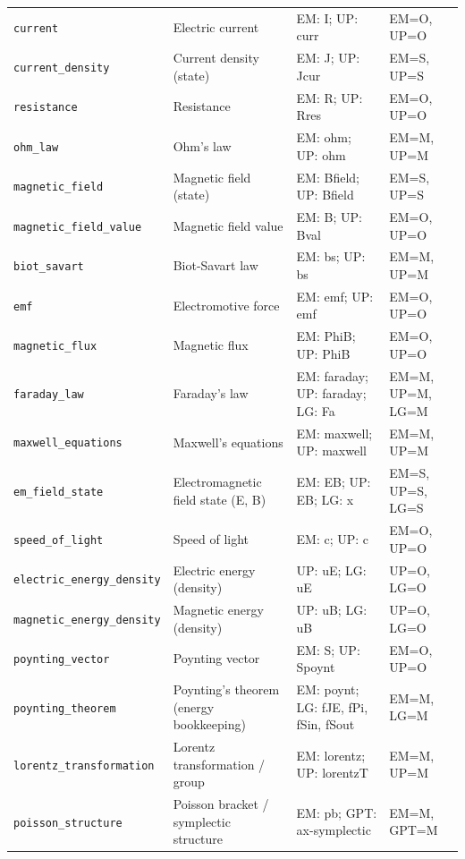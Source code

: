\begin{longtable}{@{}p{3.1cm}p{3.6cm}p{5.0cm}p{2.9cm}@{}}
\texttt{current} & Electric current & EM: I; UP: curr & EM=O, UP=O \\
\texttt{current\_\allowbreak{{}}density} & Current density (state) & EM: J; UP: Jcur & EM=S, UP=S \\
\texttt{resistance} & Resistance & EM: R; UP: Rres & EM=O, UP=O \\
\texttt{ohm\_\allowbreak{{}}law} & Ohm's law & EM: ohm; UP: ohm & EM=M, UP=M \\
\texttt{magnetic\_\allowbreak{{}}field} & Magnetic field (state) & EM: Bfield; UP: Bfield & EM=S, UP=S \\
\texttt{magnetic\_\allowbreak{{}}field\_\allowbreak{{}}value} & Magnetic field value & EM: B; UP: Bval & EM=O, UP=O \\
\texttt{biot\_\allowbreak{{}}savart} & Biot-Savart law & EM: bs; UP: bs & EM=M, UP=M \\
\texttt{emf} & Electromotive force & EM: emf; UP: emf & EM=O, UP=O \\
\texttt{magnetic\_\allowbreak{{}}flux} & Magnetic flux & EM: PhiB; UP: PhiB & EM=O, UP=O \\
\texttt{faraday\_\allowbreak{{}}law} & Faraday's law & EM: faraday; UP: faraday; LG: Fa & EM=M, UP=M, LG=M \\
\texttt{maxwell\_\allowbreak{{}}equations} & Maxwell's equations & EM: maxwell; UP: maxwell & EM=M, UP=M \\
\texttt{em\_\allowbreak{{}}field\_\allowbreak{{}}state} & Electromagnetic field state (E, B) & EM: EB; UP: EB; LG: x & EM=S, UP=S, LG=S \\
\texttt{speed\_\allowbreak{{}}of\_\allowbreak{{}}light} & Speed of light & EM: c; UP: c & EM=O, UP=O \\
\texttt{electric\_\allowbreak{{}}energy\_\allowbreak{{}}density} & Electric energy (density) & UP: uE; LG: uE & UP=O, LG=O \\
\texttt{magnetic\_\allowbreak{{}}energy\_\allowbreak{{}}density} & Magnetic energy (density) & UP: uB; LG: uB & UP=O, LG=O \\
\texttt{poynting\_\allowbreak{{}}vector} & Poynting vector & EM: S; UP: Spoynt & EM=O, UP=O \\
\texttt{poynting\_\allowbreak{{}}theorem} & Poynting's theorem (energy bookkeeping) & EM: poynt; LG: fJE, fPi, fSin, fSout & EM=M, LG=M \\
\texttt{lorentz\_\allowbreak{{}}transformation} & Lorentz transformation / group & EM: lorentz; UP: lorentzT & EM=M, UP=M \\
\texttt{poisson\_\allowbreak{{}}structure} & Poisson bracket / symplectic structure & EM: pb; GPT: ax-symplectic & EM=M, GPT=M \\

\end{longtable}
